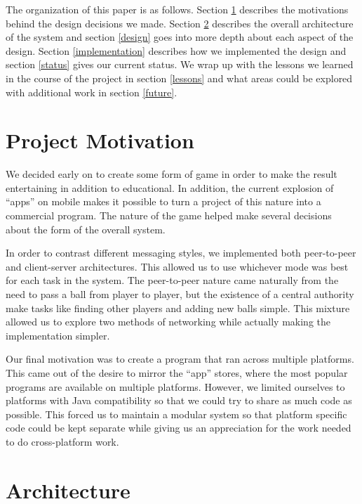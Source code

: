 \documentclass{sig-alternate}
\begin{document}
The organization of this paper is as follows.  Section \ref{motivation}
describes the motivations behind the design decisions we made.  Section
\ref{architecture} describes the overall architecture of the system and
section \ref{design} goes into more depth about each aspect of the design.
Section \ref{implementation} describes how we implemented the design and
section \ref{status} gives our current status.  We wrap up with the lessons
we learned in the course of the project in section \ref{lessons} and what
areas could be explored with additional work in section \ref{future}.


\section{Project Motivation}
\label{motivation}

We decided early on to create some form of game in order to make the result
entertaining in addition to educational.  In addition, the current
explosion of “apps” on mobile makes it possible to turn a project of this
nature into a commercial program.  The nature of the game helped make
several decisions about the form of the overall system.

In order to contrast different messaging styles, we implemented both
peer-to-peer and client-server architectures.  This allowed us to use
whichever mode was best for each task in the system.  The peer-to-peer
nature came naturally from the need to pass a ball from player to player,
but the existence of a central authority make tasks like finding other
players and adding new balls simple.  This mixture allowed us to explore
two methods of networking while actually making the implementation simpler.

Our final motivation was to create a program that ran across multiple
platforms.  This came out of the desire to mirror the “app” stores, where
the most popular programs are available on multiple platforms.  However, we
limited ourselves to platforms with Java compatibility so that we could try
to share as much code as possible.  This forced us to maintain a modular
system so that platform specific code could be kept separate while giving
us an appreciation for the work needed to do cross-platform work.


\section{Architecture}
\label{architecture}
\end{document}
